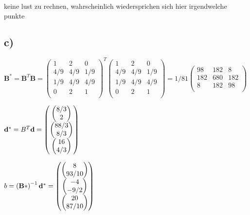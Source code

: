 keine lust zu rechnen, wahrscheinlich wiedersprichen sich hier irgendwelche punkte

\subsection*{c)}
$\mathbf{B} ^* = \mathbf{B}^T \mathbf{B} =  \left( \begin{matrix} 
    1 & 2 &0 \\
    4/9 & 4/9 &1/9 \\
    1/9 & 4/9 & 4/9 \\
    0 & 2 &1  \\
\end{matrix} \right) ^T     \left( \begin{matrix} 
        1 & 2 &0 \\
        4/9 & 4/9 &1/9 \\
        1/9 & 4/9 & 4/9 \\
        0 & 2 &1  \\
    \end{matrix} \right) =     1/81\left( \begin{matrix} 
            98 & 182 &8 \\
            182 & 680 &182 \\
            8 & 182 & 98 \\
        \end{matrix} \right) $ 
        
$\mathbf{d}^* = B^T \mathbf{d} = \left( \begin{matrix} \left( \begin{matrix}8/3 \\ 2 \end{matrix}\right) \\ \left( \begin{matrix} 88/3 \\ 8/3\end{matrix}\right) \\ \left( \begin{matrix}16 \\ 4/3 \end{matrix}\right)\end{matrix}\right) $

$b = \left(\mathbf{B*} \right)^{-1} \mathbf{d^*} = \left( \begin{matrix} \left( \begin{matrix}8 \\ 93/10  \end{matrix}\right) \\ \left( \begin{matrix} -4  \\ -9/2\end{matrix}\right) \\ \left( \begin{matrix}20 \\ 87/10 \end{matrix}\right)\end{matrix}\right) $


